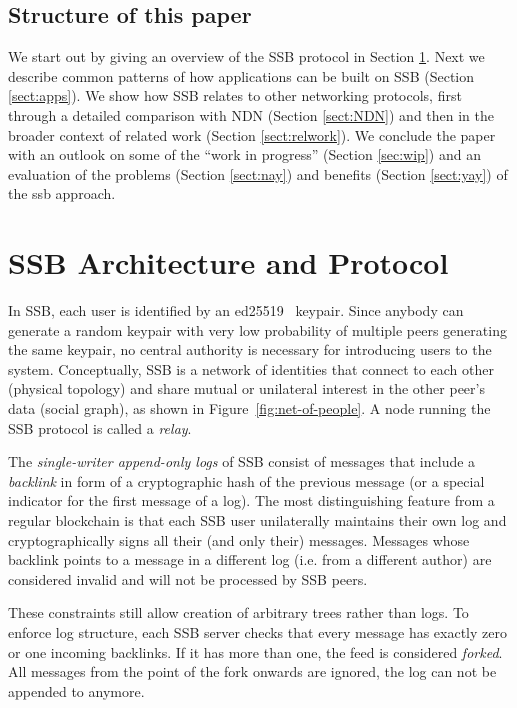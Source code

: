 \documentclass[10pt,sigconf,rewiew]{acmart}
\begin{document}
\subsection*{Structure of this paper}

We start out by giving an overview of the SSB protocol in Section \ref{sect:architecture}. Next we describe common patterns of how applications can be built on SSB (Section \ref{sect:apps}). We show how SSB relates to other networking protocols, first through a detailed comparison with NDN (Section \ref{sect:NDN}) and then in the broader context of related work (Section \ref{sect:relwork}). We conclude the paper with an outlook on some of the ``work in progress'' (Section \ref{sec:wip}) and an evaluation of the problems (Section \ref{sect:nay}) and benefits (Section \ref{sect:yay}) of the ssb approach.


\section{SSB Architecture and Protocol}
\label{sect:architecture}

In SSB, each user is identified by an ed25519~\cite{bernstein2012high} keypair. Since anybody can generate a random keypair with very low probability of multiple peers generating the same keypair, no central authority is necessary for introducing users to the system. Conceptually, SSB is a network of identities that connect to each other (physical topology) and share mutual or unilateral interest in the other peer's data (social graph), as shown in Figure~\ref{fig:net-of-people}. A node running the SSB protocol is called a \textit{relay}.

The {\em single-writer append-only logs} of SSB consist of  messages that include a {\em backlink} in form of a cryptographic hash of the previous message (or a special indicator for the first message of a log). The most distinguishing feature from a regular blockchain is that each SSB user unilaterally maintains their own log and cryptographically signs all their (and only their) messages. Messages whose backlink points to a message in a different log (i.e. from a different author) are considered invalid and will not be processed by SSB peers.

These constraints still allow creation of arbitrary trees rather than logs. To enforce log structure, each SSB server checks that every message has exactly zero or one incoming backlinks. If it has more than one, the feed is considered {\em forked}. All messages from the point of the fork onwards are ignored, the log can not be appended to anymore.
\end{document}
